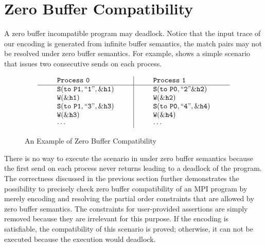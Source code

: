 \section{Zero Buffer Compatibility}
A zero buffer incompatible program may deadlock. Notice that the input trace of our encoding is generated from infinite buffer semantics, the match pairs may not be resolved under zero buffer semantics. For example,  shows a simple scenario that issues two consecutive sends on each process. 

\begin{figure}[h]
\[
\begin{array}{l|l}
\;\;\;\;\;\;\;\;\mathtt{Process\ 0}\;\;\;\;\;\;\;\; & \;\;\;\;\;\;\;\; \mathtt{Process\ 1}\;\;\;\;\;\;\;\; \\
\hline
\;\;\;\;\;\;\;\;\mathtt{S(to\ P1, ``1",\&h1)}\;\;\;\;\;\;\;\; & \;\;\;\;\;\;\;\; \mathtt{S(to\ P0,``2"\&h2)}\;\;\;\;\;\;\;\; \\
\;\;\;\;\;\;\;\;\mathtt{W(\&h1)}\;\;\;\;\;\;\;\; & \;\;\;\;\;\;\;\; \mathtt{W(\&h2)}\;\;\;\;\;\;\;\; \\
\;\;\;\;\;\;\;\;\mathtt{S(to\ P1,``3",\&h3)}\;\;\;\;\;\;\;\; & \;\;\;\;\;\;\;\; \mathtt{S(to\ P0,``4",\&h4)}\;\;\;\;\;\;\;\; \\
\;\;\;\;\;\;\;\;\mathtt{W(\&h3)}\;\;\;\;\;\;\;\; & \;\;\;\;\;\;\;\; \mathtt{W(\&h4)}\;\;\;\;\;\;\;\; \\
\;\;\;\;\;\;\;\;\mathtt{\cdots}\;\;\;\;\;\;\;\; & \;\;\;\;\;\;\;\; \mathtt{\cdots}\;\;\;\;\;\;\;\; 
\end{array}
\]
\caption{An Example of Zero Buffer Compatibility} \label{fig:compatible}
\end{figure}

There is no way to execute the scenario in  under zero buffer semantics because the first send on each process never returns leading to a deadlock of the program. The correctness discussed in the previous section further demonstrates the possibility to precisely check zero buffer compatibility of an MPI program by merely encoding and resolving the partial order constraints that are allowed by zero buffer semantics. The constraints for user-provided assertions are simply removed because they are irrelevant for this purpose. If the encoding is satisfiable, the compatibility of this scenario is proved; otherwise, it can not be executed because the execution would deadlock. 